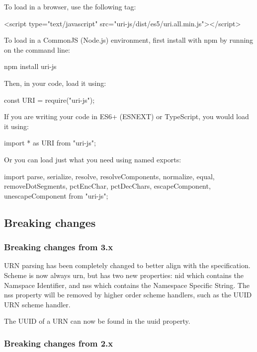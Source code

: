 To load in a browser, use the following tag\+: \begin{DoxyVerb}<script type="text/javascript" src="uri-js/dist/es5/uri.all.min.js"></script>
\end{DoxyVerb}


To load in a Common\+JS (Node.\+js) environment, first install with npm by running on the command line\+: \begin{DoxyVerb}npm install uri-js
\end{DoxyVerb}


Then, in your code, load it using\+: \begin{DoxyVerb}const URI = require("uri-js");
\end{DoxyVerb}


If you are writing your code in E\+S6+ (E\+S\+N\+E\+XT) or Type\+Script, you would load it using\+: \begin{DoxyVerb}import * as URI from "uri-js";
\end{DoxyVerb}


Or you can load just what you need using named exports\+: \begin{DoxyVerb}import { parse, serialize, resolve, resolveComponents, normalize, equal, removeDotSegments, pctEncChar, pctDecChars, escapeComponent, unescapeComponent } from "uri-js";
\end{DoxyVerb}


\subsection*{Breaking changes}

\subsubsection*{Breaking changes from 3.\+x}

U\+RN parsing has been completely changed to better align with the specification. Scheme is now always {\ttfamily urn}, but has two new properties\+: {\ttfamily nid} which contains the Namspace Identifier, and {\ttfamily nss} which contains the Namespace Specific String. The {\ttfamily nss} property will be removed by higher order scheme handlers, such as the U\+U\+ID U\+RN scheme handler.

The U\+U\+ID of a U\+RN can now be found in the {\ttfamily uuid} property.

\subsubsection*{Breaking changes from 2.\+x}

